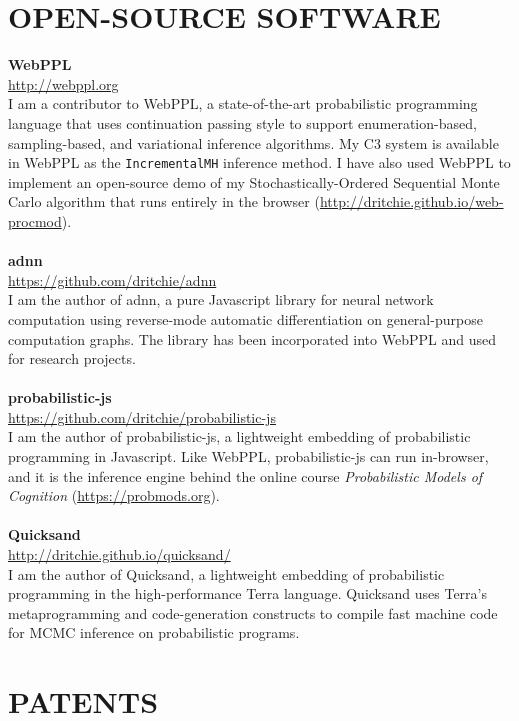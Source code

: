 \documentclass[line,margin]{res}
\begin{document}
\begin{resume}
\section{OPEN-SOURCE SOFTWARE}

\textbf{WebPPL} \\
\url{http://webppl.org} \\
I am a contributor to WebPPL, a state-of-the-art probabilistic programming language that uses continuation passing style to support enumeration-based, sampling-based, and variational inference algorithms. My C3 system is available in WebPPL as the \texttt{IncrementalMH} inference method. I have also used WebPPL to implement an open-source demo of my Stochastically-Ordered Sequential Monte Carlo algorithm that runs entirely in the browser (\url{http://dritchie.github.io/web-procmod}).
\\ \\
\textbf{adnn} \\
\url{https://github.com/dritchie/adnn} \\
I am the author of adnn, a pure Javascript library for neural network computation using reverse-mode automatic differentiation on general-purpose computation graphs. The library has been incorporated into WebPPL and used for research projects.
\\ \\
\textbf{probabilistic-js} \\
\url{https://github.com/dritchie/probabilistic-js} \\
I am the author of probabilistic-js, a lightweight embedding of probabilistic programming in Javascript. Like WebPPL, probabilistic-js can run in-browser, and it is the inference engine behind the online course \emph{Probabilistic Models of Cognition} (\url{https://probmods.org}).
\\ \\
\textbf{Quicksand} \\
\url{http://dritchie.github.io/quicksand/} \\
I am the author of Quicksand, a lightweight embedding of probabilistic programming in the high-performance Terra language. Quicksand uses Terra's metaprogramming and code-generation constructs to compile fast machine code for MCMC inference on probabilistic programs.


\section{PATENTS}


\end{resume}
\end{document}
